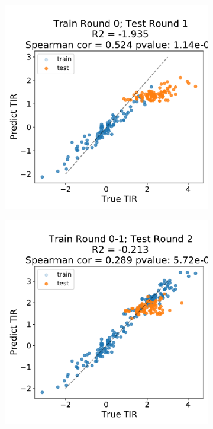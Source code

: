 \begin{figure}[!ht]
    \centering
    \begin{subfigure}[b]{0.49\textwidth}
        \centering
        \caption{}
        \includegraphics[scale=0.4]{plots/Supplementary/scatter_abc1_FF_0_salis.pdf}
    \end{subfigure}
    \begin{subfigure}[b]{0.49\textwidth}
        \centering
        \caption{}
        \includegraphics[scale=0.4]{plots/Supplementary/scatter_abc1_FF_1_salis.pdf}

\end{subfigure}
\end{figure}
